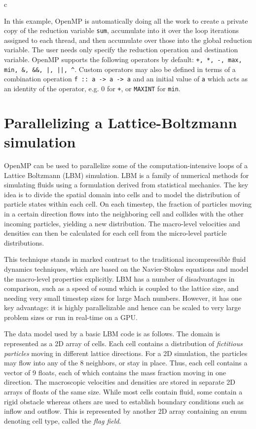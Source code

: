 \documentclass[conference, a4paper]{IEEEtran-modified}
\begin{document}
\begin{ccode}[]{c}

In this example, OpenMP is automatically doing all the work to create a private copy of the reduction variable \texttt{sum}, accumulate into it over the loop iterations assigned to each thread, and then accumulate over those into the global reduction variable. The user needs only specify the reduction operation and destination variable. OpenMP supports the following operators by default: \verb#+, *, -, max, min, &, &&, |, ||, ^#. Custom operators may also be defined in terms of a combination operation \texttt{f :: a -> a -> a} and an initial value of \texttt{a} which acts as an identity of the operator, e.g. 0 for \texttt{+}, or \texttt{MAXINT} for \texttt{min}.

\section{Parallelizing a Lattice-Boltzmann simulation}

OpenMP can be used to parallelize some of the computation-intensive loops of a Lattice Boltzmann (LBM) simulation. LBM is a family of numerical methods for simulating fluids using a formulation derived from statistical mechanics. The key idea is to divide the spatial domain into cells and to model the distribution of particle states within each cell. On each timestep, the fraction of particles moving in a certain direction flows into the neighboring cell and collides with the other incoming particles, yielding a new distribution. The macro-level velocities and densities can then be calculated for each cell from the micro-level particle distributions.

This technique stands in marked contrast to the traditional incompressible fluid dynamics techniques, which are based on the Navier-Stokes equations and model the macro-level properties explicitly. LBM has a number of disadvantages in comparison, such as a speed of sound which is coupled to the lattice size, and needing very small timestep sizes for large Mach numbers. However, it has one key advantage: it is highly parallelizable and hence can be scaled to very large problem sizes or run in real-time on a GPU.

The data model used by a basic LBM code is as follows. The domain is represented as a 2D array of cells. Each cell contains a distribution of \emph{fictitious particles} moving in different lattice directions. For a 2D simulation, the particles may flow into any of the 8 neighbors, or stay in place. Thus, each cell contains a vector of 9 floats, each of which contains the mass fraction moving in one direction. The macroscopic velocities and densities are stored in separate 2D arrays of floats of the same size. While 
most cells contain fluid, some contain a rigid obstacle whereas others are used to establish boundary conditions such as inflow and outflow. This is represented by another 2D array containing an enum denoting cell type, called the \emph{flag field}.


\end{ccode}
\end{document}
